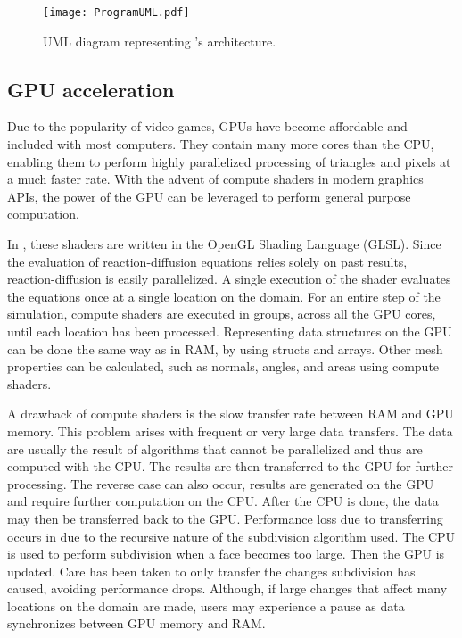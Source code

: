 \begin{figure}[H]
	\centering
	\texttt{[image: ProgramUML.pdf]}
	\caption{UML diagram representing \ProgramName{}'s architecture.}
	\label{fig:umlDiagram}
\end{figure}

\subsection{GPU acceleration}
Due to the popularity of video games, GPUs have become affordable and included with most computers. They contain many more cores than the CPU, enabling them to perform highly parallelized processing of triangles and pixels at a much faster rate. With the advent of compute shaders in modern graphics APIs, the power of the GPU can be leveraged to perform general purpose computation. 

In \ProgramName{}, these shaders are written in the OpenGL Shading Language (GLSL). Since the evaluation of reaction-diffusion equations relies solely on past results, reaction-diffusion is easily parallelized. A single execution of the shader evaluates the equations once at a single location on the domain. For an entire step of the simulation, compute shaders are executed in groups, across all the GPU cores, until each location has been processed. Representing data structures on the GPU can be done the same way as in RAM, by using structs and arrays. Other mesh properties can be calculated, such as normals, angles, and areas using compute shaders.

A drawback of compute shaders is the slow transfer rate between RAM and GPU memory. This problem arises with frequent or very large data transfers. The data are usually the result of algorithms that cannot be parallelized and thus are computed with the CPU. The results are then transferred to the GPU for further processing. The reverse case can also occur, results are generated on the GPU and require further computation on the CPU. After the CPU is done, the data may then be transferred back to the GPU. Performance loss due to transferring occurs in \ProgramName{} due to the recursive nature of the subdivision algorithm used. The CPU is used to perform subdivision when a face becomes too large. Then the GPU is updated. Care has been taken to only transfer the changes subdivision has caused, avoiding performance drops. Although, if large changes that affect many locations on the domain are made, users may experience a pause as data synchronizes between GPU memory and RAM. 

